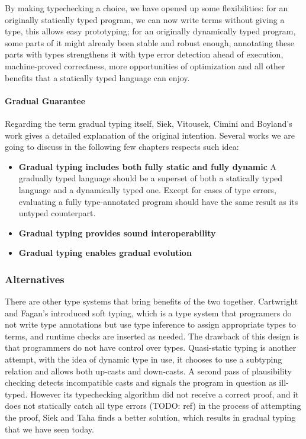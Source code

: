 By making typechecking a choice, we have opened up some flexibilities:
for an originally statically typed program, we can now write terms without giving a type,
this allows easy prototyping; for an originally dynamically typed program,
some parts of it might already been stable and robust enough, annotating these parts
with types strengthens it with type error detection ahead of execution, machine-proved correctness,
more opportunities of optimization and 
all other benefits that a statically typed language can enjoy.


\paragraph{Gradual Guarantee}

Regarding the term gradual typing itself,
Siek, Vitousek, Cimini and Boyland's work gives a detailed explanation of
the original intention.
Several works we are going to discuss in the following few chapters respects
such idea:

\begin{itemize}
	\item \textbf{Gradual typing includes both fully static and fully dynamic}
	A gradually typed language should be a superset of both a statically typed
	language and a dynamically typed one.
	Except for cases of type errors, evaluating a fully type-annotated program
	should have the same result as its untyped counterpart.
	\item \textbf{Gradual typing provides sound interoperability}
	\item \textbf{Gradual typing enables gradual evolution}
\end{itemize}


\subsubsection{Alternatives}

There are other type systems that bring benefits of the two together.
Cartwright and Fagan's introduced soft typing, which is a type system
that programers do not write type annotations but use type inference to
assign appropriate types to terms, and runtime checks are inserted as needed.
The drawback of this design is that programmers do not have control over types.
Quasi-static typing is another attempt, with the idea of dynamic type in use,
it chooses to use a subtyping relation and allows both up-casts and down-casts.
A second pass of plausibility checking detects incompatible casts and signals the program
in question as ill-typed. However its typechecking algorithm did not receive a correct proof,
and it does not statically catch all type errors (TODO: ref)
in the process of attempting the proof, Siek and Taha finds a better solution, 
which results in gradual typing that we have seen today.

